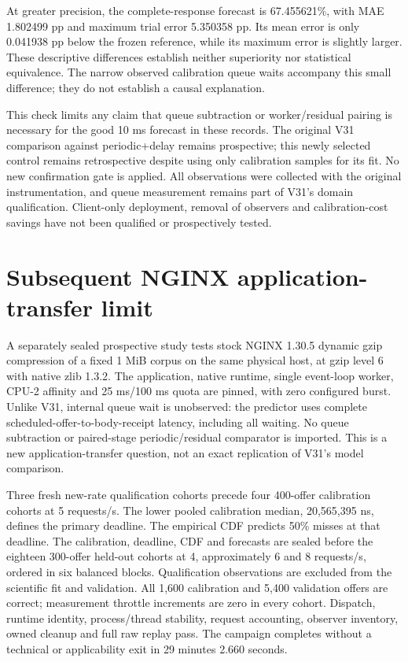 \documentclass[11pt,a4paper]{article}
\begin{document}
At greater precision, the complete-response forecast is 67.455621\%, with MAE 1.802499 pp
and maximum trial error 5.350358 pp. Its mean error is only 0.041938 pp below
the frozen reference, while its maximum error is slightly larger. These
descriptive differences establish neither superiority nor statistical
equivalence. The narrow observed calibration queue waits accompany this
small difference; they do not establish a causal explanation.

This check limits any claim that queue subtraction or worker/residual pairing
is necessary for the good 10 ms forecast in these records. The original V31
comparison against periodic+delay remains prospective; this newly selected
control remains retrospective despite using only calibration samples for
its fit. No new confirmation gate is applied. All observations were collected
with the original instrumentation, and queue measurement remains part of
V31's domain qualification. Client-only deployment, removal of observers and
calibration-cost savings have not been qualified or prospectively tested.

\section{Subsequent NGINX application-transfer limit}

A separately sealed prospective study tests stock NGINX 1.30.5 dynamic gzip
compression of a fixed 1 MiB corpus on the same physical host, at gzip level 6
with native zlib 1.3.2. The application,
native runtime, single event-loop worker, CPU-2 affinity and 25 ms/100 ms quota
are pinned, with zero configured burst. Unlike V31, internal queue wait is
unobserved: the predictor uses complete scheduled-offer-to-body-receipt latency,
including all waiting. No queue subtraction or paired-stage periodic/residual
comparator is imported. This is a new application-transfer question, not an
exact replication of V31's model comparison.

Three fresh new-rate qualification cohorts precede four 400-offer calibration
cohorts at 5 requests/s. The lower pooled calibration median, 20,565,395 ns,
defines the primary deadline. The empirical CDF predicts 50\% misses at that
deadline. The calibration, deadline, CDF and forecasts are sealed before the
eighteen 300-offer held-out cohorts at 4, approximately 6 and 8 requests/s,
ordered in six balanced blocks. Qualification observations are excluded from
the scientific fit and validation. All 1,600 calibration and 5,400 validation
offers are correct; measurement throttle increments are zero in every cohort.
Dispatch, runtime identity, process/thread stability, request accounting,
observer inventory, owned cleanup and full raw replay pass. The campaign
completes without a technical or applicability exit in 29 minutes 2.660 seconds.
\end{document}
